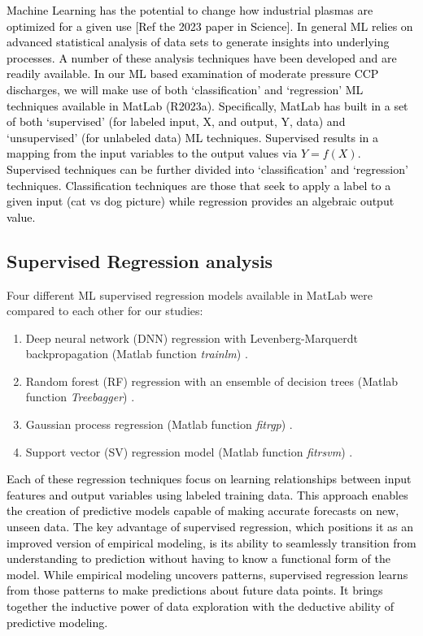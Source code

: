 \documentclass[12pt]{iopart}
\begin{document}
\textcolor{black}{Machine Learning has the potential to change how industrial plasmas are optimized for a given use [Ref the 2023 paper in Science].  In general ML relies on advanced statistical analysis of data sets to generate insights into underlying processes.  A number of these analysis techniques have been developed and are readily available.  In our ML based examination of moderate pressure CCP discharges, we will make use of both `classification' and `regression' ML techniques available in MatLab (R2023a). Specifically, MatLab has built in a set of both `supervised' (for labeled input, X, and output, Y, data) and `unsupervised' (for unlabeled data) ML techniques.  Supervised results in a mapping from the input variables to the output values via $Y=f\left(X\right)$.  Supervised techniques can be further divided into `classification' and `regression' techniques.  Classification techniques are those that seek to apply a label to a given input (cat vs dog picture) while regression provides an algebraic output value. }

\subsection{Supervised Regression analysis}\label{Sect:RegressionAnalysis}
Four different ML supervised regression models available in MatLab were compared to each other for our studies:
\begin{enumerate}
    \item Deep neural network (DNN) regression with Levenberg-Marquerdt backpropagation (Matlab function \textit{trainlm}) \cite{levenberg1944, marquardt1963}.
    \item Random forest (RF) regression \cite{Ho:1998, Breiman:1984, Breiman:2001} with an ensemble of decision trees (Matlab function \textit{Treebagger}) \cite{Breiman:1984, Safavian:1991}.
    \item Gaussian process regression (Matlab function \textit{fitrgp}) \cite{rasmussen2006, krige1951, matheron1963, o1994}. 
    \item Support vector (SV) regression model (Matlab function \textit{fitrsvm}) \cite{Vapnik:1982, Vapnik:1995, Cortes:1995, Vapnik:2000, Vapnik:2006}.
\end{enumerate}
\textcolor{black}{Each of these regression techniques focus on learning relationships between input features and output variables using labeled training data. This approach enables the creation of predictive models capable of making accurate forecasts on new, unseen data. The key advantage of supervised regression, which positions it as an improved version of empirical modeling, is its ability to seamlessly transition from understanding to prediction without having to know a functional form of the model. While empirical modeling uncovers patterns, supervised regression learns from those patterns to make predictions about future data points. It brings together the inductive power of data exploration with the deductive ability of predictive modeling.}
\end{document}
